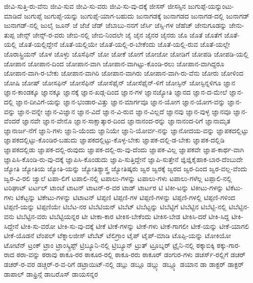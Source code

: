 {ಜೀವಿ-ಸುತ್ತಿ-ರು-ವೆನು
ಜೀವಿ-ಸುವ
ಜೀವಿ-ಸು-ವರು
ಜೀವಿ-ಸು-ವು-ದಕ್ಕೆ
ಜೀಸಸ್
ಜೀಸಸ್ಸಿನ
ಜುಗುಪ್ಪೆ-ಯನ್ನುಂಟು-ಮಾಡಿದೆ
ಜುಗುಪ್ಸೆ
ಜುಗುಪ್ಸೆ-ಯನ್ನು
ಜುಗುಪ್ಸೆ-ಯಾಗ-ಬಹುದು
ಜುನಾಗಡಕ್ಕೆ
ಜುನಾಗಡದ
ಜುನಾಗಡ-ದಲ್ಲಿ
ಜುನಾಗಡ್
ಜುನಾಗಡ್-ನಲ್ಲಿ
ಜುಲೈ
ಜೂನ್
ಜೆ
ಜೆಜೆ
ಜೆಡ್
ಜೆಬಾಬು-ನನಗೆ
ಜೆರ್ಸಿ
ಜೆಸ್ಸಿ-ಗಳ
ಜೆಹೆಚ್
ಜೇನುಗೂಡನ್ನು
ಜೇನು-ತುಪ್ಪ
ಜೇನ್ಸ್
ಜೇನ್ಸ್-ರ-ವರು
ಜೇಬಿ-ನಲ್ಲಿ
ಜೇಬಿ-ನಿಂದಲೇ
ಜೈ
ಜೈನ
ಜೈನರ
ಜೈನರು
ಜೊ
ಜೊತೆ
ಜೊತೆಗೆ
ಜೊತೆ-ಯಲ್ಲಿ
ಜೊತೆ-ಯಲ್ಲಿದ್ದೇನೆ
ಜೊತೆ-ಯಲ್ಲಿಯೇ
ಜೊತೆ-ಯಲ್ಲಿ-ರ-ಬೇಕೆಂದು
ಜೊತೆ-ಯಲ್ಲಿ-ರುವ
ಜೊತೆ-ಯಲ್ಲೇ
ಜೊರಾಸ್ಟ್ರಿಯನ್
ಜೊಳ
ಜೊಳ್ಳು
ಜೊಸೆಫಿನ್
ಜೋ
ಜೋಕೆ
ಜೋಗೆ
ಜೋಜೋ
ಜೋಡಿಗೆ
ಜೋಪಡಿ
ಜೋಪಡಿ-ಯಲ್ಲಿ
ಜೋಪಾನ
ಜೋಪಾನ-ದಿಂದ
ಜೋಪಾನ-ವಾಗಿ
ಜೋಪಾನ-ವಾಗಿಟ್ಟು-ಕೊಂಡಿ-ರಲು
ಜೋಪಾನ-ವಾಗಿದ್ದರೂ
ಜೋಪಾನ-ವಾಗಿ-ರ-ಬೇಕು
ಜೋಪಾನ-ವಾಗಿರಿ
ಜೋಪಾನ-ವಾಗಿರು
ಜೋಪಾನ-ವಾಗಿ-ರು-ವೆನು
ಜೋರು
ಜೋಳಿಂದ
ಜೋಷಿ
ಜೋಷ್
ಜೋಸಫಿನ್
ಜೋಸೆಫಿನ್
ಜೋಸೆಫೈನ್
ಜೋಸೆಫೈನ್-ಳಿಗೆ
ಜೋಸ್ಫಿನ್
ಜೋಸ್ಫಿನ್ನಳಿಗೂ
ಜ್ಞಾನ
ಜ್ಞಾನ-ಕಾಂಡಕ್ಕೂ
ಜ್ಞಾನಕ್ಕೂ
ಜ್ಞಾನಕ್ಕೆ
ಜ್ಞಾನ-ಖಡ್ಗ-ದಿಂದ
ಜ್ಞಾನ-ಗಳ
ಜ್ಞಾನಜ್ಯೋತಿ
ಜ್ಞಾನದ
ಜ್ಞಾನ-ದ-ಮೇಲೆ
ಜ್ಞಾನ-ದಲ್ಲಿ
ಜ್ಞಾನ-ದೀವಿಗೆ-ಯನ್ನು
ಜ್ಞಾನ-ಭಂಡಾರ-ವಿತ್ತು
ಜ್ಞಾನ-ಮಾರ್ಗವೂ
ಜ್ಞಾನ-ಯೋಗ
ಜ್ಞಾನ-ಯೋಗ-ವನ್ನು
ಜ್ಞಾನ-ವನ್ನು
ಜ್ಞಾನ-ವನ್ನೇ
ಜ್ಞಾನ-ವಿಜ್ಞಾನ
ಜ್ಞಾನ-ವಿದೆ
ಜ್ಞಾನ-ವಿ-ರುವ
ಜ್ಞಾನ-ವಿಲ್ಲದೆ
ಜ್ಞಾನವು
ಜ್ಞಾನ-ವುಳ್ಳ
ಜ್ಞಾನವೂ
ಜ್ಞಾನ-ವೆಂದರೆ
ಜ್ಞಾನವೇ
ಜ್ಞಾನ-ವೇನೊ
ಜ್ಞಾನ-ಸಾಕ್ಷಾತ್ಕಾರ-ದಿಂದ
ಜ್ಞಾನಾನಂದ-ರನ್ನು
ಜ್ಞಾನಾನಂದ-ರಿಗೆ
ಜ್ಞಾನಾಮೃತ
ಜ್ಞಾನಾರ್ಜ-ನೆಗೆ
ಜ್ಞಾನಿ-ಗಳು
ಜ್ಞಾನಿ-ಯೆಂದು
ಜ್ಞಾನಿಯೇ
ಜ್ಞಾನಿ-ಯೋರ್ವ-ನನ್ನು
ಜ್ಞಾನೋದಯ-ವನ್ನು
ಜ್ಞಾಪಕದಲ್ಲಿಟ್ಟು
ಜ್ಞಾಪಕದಲ್ಲಿಟ್ಟು-ಕೊಂಡಿರ-ಬಹುದು
ಜ್ಞಾಪಕದಲ್ಲಿಟ್ಟು-ಕೊಳ್ಳ-ಬೇಕು
ಜ್ಞಾಪಕ-ದಲ್ಲಿ-ಡ-ಬೇಕು
ಜ್ಞಾಪಕ-ದಲ್ಲಿಡಿ
ಜ್ಞಾಪಕದಲ್ಲಿಡು
ಜ್ಞಾಪಕ-ದಲ್ಲಿ-ರುವುದು
ಜ್ಞಾಪಕ-ದಲ್ಲಿ-ರು-ವು-ದೆಂದು
ಜ್ಞಾಪಕ-ವಿಲ್ಲ
ಜ್ಞಾಪಕವೇ
ಜ್ಞಾಪ-ಕಾರ್ಥ-ವಾಗಿ
ಜ್ಞಾಪಿಸಿ-ಕೊಂಡಿ-ರು-ವು-ದಕ್ಕೆ
ಜ್ಞಾಪಿಸಿ-ಕೊಂಡುದು
ಜ್ಞಾಪಿ-ಸುತ್ತಿದ್ದೇನೆ
ಜ್ಞಾಪಿ-ಸುತ್ತೇನೆ
ಜ್ಞಿಜ್ಞಿಕೈಹಾಕ-ಬಾರ-ದೆಂಬುದೇ
ಜ್ಯೋತಿ
ಜ್ಯೋತಿಯ
ಜ್ಯೋತಿ-ಯನ್ನು
ಜ್ಯೋತಿಶ್ಯಾಸ್ತ್ರ
ಜ್ಯೋತಿಷ್ಕರು
ಜ್ವರ
ಜ್ವರಕ್ಕೆ
ಜ್ವರದ
ಜ್ವರ-ದಿಂದ
ಜ್ವರ-ವಲ್ಲ-ವೆಂದು
ಜ್ವರ-ವಿ-ರಲಿ
ಜ್ವಾಲೆ
ಟಪಾ-ಲಿಗೆ
ಟಪಾಲಿ-ನಲ್ಲಿ
ಟಪಾಲು-ಗಳನ್ನು
ಟಪಾಲು-ಗಳು
ಟಪಾಲು-ಗಳೆಲ್ಲ
ಟಪ್ಪಾಲಿ-ನಲ್ಲಿ
ಟರಿಘಾಟ್
ಟರ್ಟಲ್
ಟಾಂಟೆ
ಟಾಟನ್
ಟಾಟನ್-ರ-ವರ
ಟಾಡ್
ಟಾರ್ಟರ
ಟಿ
ಟಿಕೀ-ಟನ್ನು
ಟಿಕೀಟು-ಗಳನ್ನು
ಟಿಕೆಟು-ಗಳು
ಟಿಕೆಟ್ಟನ್ನು
ಟಿಕೇಟು-ಗಳನ್ನು
ಟಿಟಾಟನ್
ಟಿಪ್ಪಣಿ
ಟಿಪ್ಪಣಿ-ಗಳ
ಟಿಪ್ಪಣಿ-ಗಳನ್ನು
ಟಿಪ್ಪಣಿ-ಗಳಲ್ಲಿ
ಟಿಪ್ಪಣಿ-ಗಳಿಂದ
ಟಿಪ್ಪಣಿ-ಯನ್ನು
ಟಿಪ್ಪಣಿಯೇ
ಟಿಬೆಟ-ನರ
ಟಿಬೆಟಿಯನ್
ಟಿಬೆಟ್
ಟಿಬೆಟ್ಟನ್ನು
ಟಿಬೆಟ್ಟಿಗೆ
ಟಿಬೆಟ್ಟಿನ
ಟಿಬೆಟ್ಟಿ-ನಲ್ಲಿ
ಟಿಬೆಟ್ಟಿನ-ವನು
ಟಿಬೆಟ್ಟಿನ-ವರು
ಟಿಬೆಟ್ಟಿಯನ್ನರ
ಟೀ
ಟೀಕಾ-ಕಾರ
ಟೀಕಿಸ-ಬೇಕೆಂದು
ಟೀಕಿಸ-ಬೇಡ
ಟೀಕಿಸಿ-ದರೆ
ಟೀಕಿ-ಸಿದ್ದ
ಟೀಕಿ-ಸಿದ್ದೇನೆ
ಟೀಕಿ-ಸು-ವರೋ
ಟೀಕಿ-ಸು-ವು-ದಕ್ಕೆ
ಟೀಕೆ
ಟೀಕೆ-ಗಳನ್ನು
ಟೀಕೆ-ಗಳು
ಟೀಕೆ-ಗಾಗಲೀ
ಟೀಕೆ-ಯನ್ನು
ಟೀಕೆ-ಯಾಗಲಿ
ಟೀಕೆ-ಯೊಡನೆ
ಟೆಂಪಲ್
ಟೆಕ್ನಾಲಜೀಸ್
ಟೆಬೆಟ್
ಟೆಲಿಗ್ರಾಂ
ಟೈಪ್
ಟೈಪ್-ಮಾಡಿ
ಟೊಪ್ಪಿ-ಯನ್ನು
ಟೋಕಿಯೋ
ಟೋಟೆನ್
ಟ್ರಂಕ್
ಟ್ರಾಂ
ಟ್ರಾಂಸ್ಕ್ರಿಪ್ಟ್
ಟ್ರಿಬ್ಯೂನಿ-ನಲ್ಲಿ
ಟ್ರಿಬ್ಯೂನ್
ಟ್ರುತ್
ಟ್ರೂಬ್ನರ್
ಟ್ರೈನಿ-ನಲ್ಲಿ
ಠಕ್ಕಾಬಿಕ್ಕಿ
ಠಕ್ಕು-ಗಾರ-ರಾದ
ಠರಾ-ವನ್ನು
ಠರಾವು
ಠಾಕೂ-ರರ
ಠಾಕೂರ-ರಲ್ಲಿ
ಠಾಕೂ-ರರು
ಠಾಕೂರ್
ಡಂಗುರ-ಗಳು
ಡಚರ್ಸ್-ರಲ್ಲಿಗೆ
ಡಚರ್
ಡಚರ್-ರ-ವರ
ಡಚ್ಚರ್-ರ-ವ-ರಿಗೆ
ಡಟ್ರಾಯಿಟ್-ನಲ್ಲಿ
ಡಬ್ಲು
ಡಬ್ಲೂ
ಡಬ್ಲ್ಯು
ಡಬ್ಲ್ಯೂ
ಡಯಾನ
ಡಾ
ಡಾಕ್ಟರ್
ಡಾಕ್ಟರ್
ಡಾಪಾಲ್
ಡಾಫ್ರಿನ್ಗೆ
ಡಾಬರೊಸ್
ಡಾಯಸನ್ನರ
}
